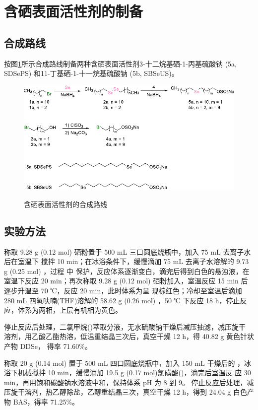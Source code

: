 \documentclass[bachelor,fandolfonts,replaceperiod]{jnuthesis}
\begin{document}
    \section{含硒表面活性剂的制备}
    \subsection{合成路线}
    按图\ref{fig:scheme-synthesis}所示合成路线制备两种含硒表面活性剂3-十二烷基硒-1-丙基硫酸钠 
    (5a, SDSePS) 和11-丁基硒-1-十一烷基硫酸钠 (5b, SBSeUS)。
    \begin{figure}[htbp]
        \centering
        \includegraphics[scale=1]{figure/scheme-synthesis.pdf}\\
        \caption{含硒表面活性剂的合成路线}\label{fig:scheme-synthesis}
    \end{figure}

    \subsection{实验方法}
    称取 9.28 g (0.12 mol) 硒粉置于 500 mL 三口圆底烧瓶中，加入 75 mL 去离子水后在室温下
    搅拌 10 min；在冰浴条件下，缓慢滴加 75 mL 去离子水溶解的 9.73 g (0.25 mol) ，过程
    中  保护，反应体系逐渐变白，滴完后得到白色的悬浊液，在室温下反应 20 min；再次称取
    9.28 g (0.12 mol) 硒粉加入，室温反应 15 min 后逐步升温至 70 ℃，反应 20 min，此时体系为呈
    现棕红色；冷却至室温后滴加 280 mL 四氢呋喃(THF)溶解的 58.62 g (0.26 mol) ，50 ℃
    下反应 18 h，停止反应，体系为两相，上层有机相为黄色。
    
    停止反应后处理，二氯甲烷()萃取分液，无水硫酸钠干燥后减压抽滤，减压旋干
    溶剂，用乙酸乙酯热溶，低温重结晶三次后，真空干燥 12 h，得 40.82 g 黄色针状产物 DDSe，
    得率 71.60\%。
    
    称取 20 g (0.14 mol)  置于 500 mL 四口圆底烧瓶中，加入 150 mL 干燥后的
    ，冰浴下机械搅拌 10 min，缓慢滴加 19.5 g (0.17 mol)氯磺酸()，滴完后室温反
    应 30 min，再用饱和碳酸钠水溶液中和，保持体系 pH 为 8 到 9。
    停止反应后处理，减压旋干溶剂，热乙醇除盐，乙醇重结晶三次，真空干燥 12 h，得到
    24.04 g 白色产物 BAS，得率 71.25\%。
    
\end{document}
